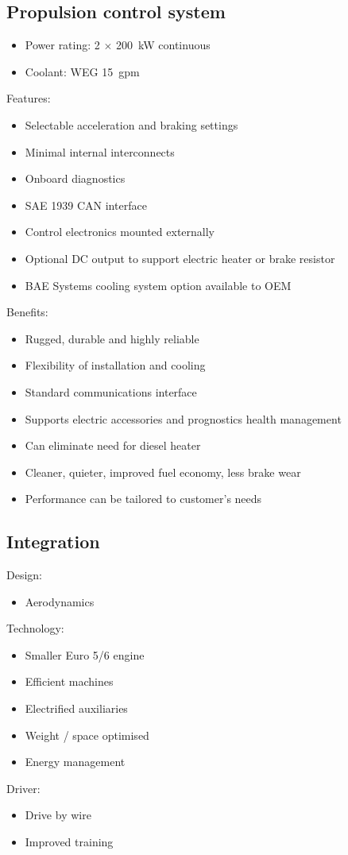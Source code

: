 \subsection{Propulsion control system}
\begin{itemize}
    \item Power rating: 2 $\times$ \SI{200}{\kilo\watt} continuous
    \item Coolant: WEG \SI{15}{gpm}
\end{itemize}
Features:
\begin{itemize}
    \item Selectable acceleration and braking settings
    \item Minimal internal interconnects
    \item Onboard diagnostics
    \item SAE 1939 CAN interface
    \item Control electronics mounted externally
    \item Optional DC output to support electric heater or brake resistor
    \item BAE Systems cooling system option available to OEM
\end{itemize}
Benefits:
\begin{itemize}
    \item Rugged, durable and highly reliable
    \item Flexibility of installation and cooling
    \item Standard communications interface
    \item Supports electric accessories and prognostics health management
    \item Can eliminate need for diesel heater
    \item Cleaner, quieter, improved fuel economy, less brake wear
    \item Performance can be tailored to customer's needs
\end{itemize}
\subsection{Integration}
Design:
\begin{itemize}
    \item Aerodynamics
\end{itemize}
Technology:
\begin{itemize}
    \item Smaller Euro 5/6 engine
    \item Efficient machines
    \item Electrified auxiliaries
    \item Weight / space optimised
    \item Energy management
\end{itemize}
Driver:
\begin{itemize}
    \item Drive by wire
    \item Improved training
\end{itemize}
